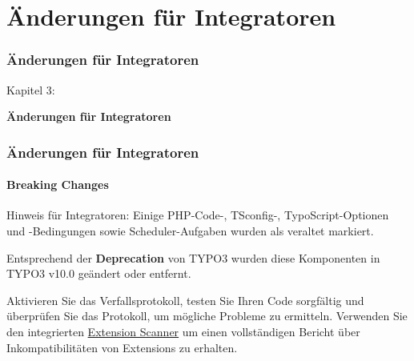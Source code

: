 %

\section{Änderungen für Integratoren}
\begin{frame}[fragile]
	\frametitle{Änderungen für Integratoren}

	\begin{center}\huge{Kapitel 3:}\end{center}
	\begin{center}\huge{\color{typo3darkgrey}\textbf{Änderungen für Integratoren}}\end{center}

\end{frame}


\begin{frame}[fragile]
	\frametitle{Änderungen für Integratoren}
	\framesubtitle{Breaking Changes}

	\small
		Hinweis für Integratoren: Einige PHP-Code-, TSconfig-, TypoScript-Optionen
		und -Bedingungen sowie Scheduler-Aufgaben wurden als veraltet markiert.

		\vspace{0.2cm}

		Entsprechend der \textbf{Deprecation} von TYPO3 wurden diese 
		Komponenten in TYPO3 v10.0 geändert oder entfernt.

		Aktivieren Sie das Verfallsprotokoll, testen Sie Ihren Code sorgfältig und überprüfen
		Sie das Protokoll, um mögliche Probleme zu ermitteln. Verwenden Sie den integrierten
		\href{https://docs.typo3.org/m/typo3/reference-coreapi/master/en-us/ApiOverview/ExtensionScanner/Index.html}{Extension Scanner}
		um einen vollständigen Bericht über Inkompatibilitäten von Extensions zu erhalten.

	\normalsize

\end{frame}


